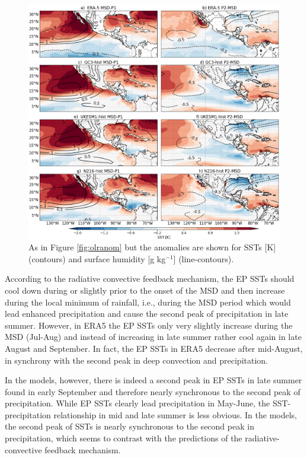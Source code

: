  
\begin{figure}[b!]
\includegraphics[width=\linewidth]{figures/fig4_sstv_3.png}
\caption[Composite SST anomalies]{As in Figure \ref{fig:olranom} but the anomalies are shown for SSTs [K] (contours) and surface humidity [g kg$^{-1}$] (line-contours).  }
\label{fig:msdsstanom}
\end{figure}

According to the radiative convective feedback mechanism, the EP SSTs should cool down during or slightly prior to the onset of the MSD and then increase during the local minimum of rainfall, i.e., during the MSD period which would lead enhanced precipitation and cause the second peak of precipitation in late summer. However, in ERA5 the EP SSTs only very slightly increase during the MSD (Jul-Aug) and instead of increasing in late summer rather cool again in late August and September. In fact, the EP SSTs in ERA5 decrease after mid-August, in synchrony with the second peak in deep convection and precipitation. 

 In the models, however, there is indeed a second peak in EP SSTs in late summer found in early September and therefore nearly synchronous to the second peak of precipitation. While EP SSTs clearly lead precipitation in May-June, the SST-precipitation relationship in mid and late summer is less obvious. In the models, the second peak of SSTs is nearly synchronous to the second peak in precipitation, which seems to contrast with the predictions of the radiative-convective feedback mechanism.
 
